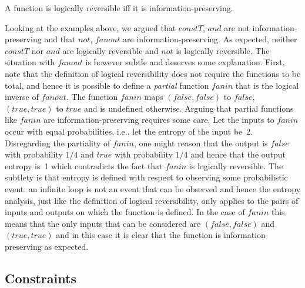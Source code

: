 \begin{proposition}
A function is logically reversible iff it is information-preserving.
\end{proposition}

Looking at the examples above, we argued that \ensuremath{\mathit{constT}}, \ensuremath{\mathit{and}} are
not information-preserving and that \ensuremath{\mathit{not}}, \ensuremath{\mathit{fanout}} are
information-preserving. As expected, neither \ensuremath{\mathit{constT}} nor \ensuremath{\mathit{and}}
are logically reversible and \ensuremath{\mathit{not}} is logically reversible. The
situation with \ensuremath{\mathit{fanout}} is however subtle and deserves some
explanation. First, note that the definition of logical reversibility
does not require the functions to be total, and hence it is possible
to define a \emph{partial} function \ensuremath{\mathit{fanin}} that is the logical
inverse of \ensuremath{\mathit{fanout}}. The function \ensuremath{\mathit{fanin}} maps \ensuremath{(\mathit{false},\mathit{false})}
to \ensuremath{\mathit{false}}, \ensuremath{(\mathit{true},\mathit{true})} to \ensuremath{\mathit{true}} and is undefined
otherwise. Arguing that partial functions like \ensuremath{\mathit{fanin}} are
information-preserving requires some care. Let the inputs to \ensuremath{\mathit{fanin}}
occur with equal probabilities, i.e., let the entropy of the input
be~2. Disregarding the partiality of \ensuremath{\mathit{fanin}}, one might reason that
the output is \ensuremath{\mathit{false}} with probability $1/4$ and \ensuremath{\mathit{true}} with
probability $1/4$ and hence that the output entropy is~1 which
contradicts the fact that \ensuremath{\mathit{fanin}} is logically reversible. The
subtlety is that entropy is defined with respect to observing some
probabilistic event: an infinite loop is not an event that can be
observed and hence the entropy analysis, just like the definition of
logical reversibility, only applies to the pairs of inputs and outputs
on which the function is defined. In the case of \ensuremath{\mathit{fanin}} this means
that the only inputs that can be considered are \ensuremath{(\mathit{false},\mathit{false})} and
\ensuremath{(\mathit{true},\mathit{true})} and in this case it is clear that the function is
information-preserving as expected.


\subsection{Constraints}

